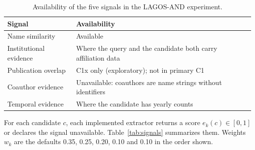 \begin{table}[t]
\caption{Availability of the five signals in the LAGOS-AND experiment.}
\label{tab:availability}
\centering
\footnotesize
\renewcommand{\arraystretch}{1.1}
\begin{tabular}{@{}p{}p{}@{}}
\toprule
\textbf{Signal} & \textbf{Availability} \\
\midrule
Name similarity & Available \\
Institutional evidence & Where the query and the candidate both carry affiliation data \\
Publication overlap & C1x only (exploratory); not in primary C1 \\
Coauthor evidence & Unavailable: coauthors are name strings without identifiers \\
Temporal evidence & Where the candidate has yearly counts \\
\bottomrule
\end{tabular}
\end{table}

For each candidate $c$, each implemented extractor returns a score $e_k(c)\in[0,1]$ or declares the signal unavailable. Table~\ref{tab:signals} summarizes them. Weights $w_k$ are the defaults 0.35, 0.25, 0.20, 0.10 and 0.10 in the order shown.

